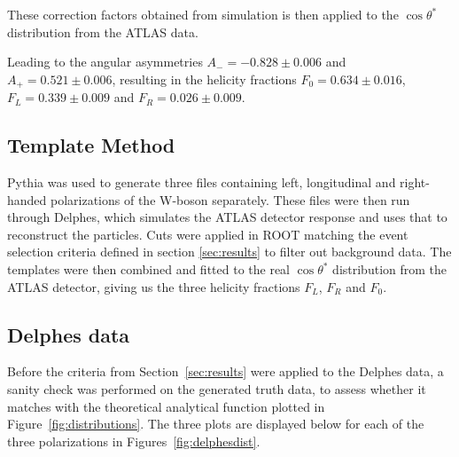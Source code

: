 \documentclass[12pt,a4paper]{article}
\numberwithin{equation}{section}
\begin{document}
These correction factors obtained from simulation is then applied to the
$\cos\theta^{*}$ distribution from the ATLAS data.

Leading to the angular asymmetries $A_- = -0.828 \pm 0.006$ and
$A_+ = 0.521 \pm 0.006$, resulting in the helicity fractions
$F_0=0.634 \pm 0.016$, $F_L=0.339 \pm 0.009$ and $F_R=0.026 \pm 0.009$.

\subsection{Template Method}
Pythia was used to generate three files containing left, longitudinal and
right-handed polarizations of the W-boson separately. These files were then run
through Delphes, which simulates the ATLAS detector response and uses that to
reconstruct the particles. Cuts were applied in ROOT matching the event
selection criteria defined in section \ref{sec:results} to filter out background
data. The templates were then combined and fitted to the real $\cos \theta^{*}$
distribution from the ATLAS detector, giving us the three helicity fractions
$F_L$, $F_R$ and $F_0$.


\subsection{Delphes data}
Before the criteria from Section~\ref{sec:results} were applied to the Delphes
data, a sanity check was performed on the generated truth data, to assess
whether it matches with the theoretical analytical function plotted in
Figure~\ref{fig:distributions}. The three plots are displayed below for each of
the three polarizations in Figures~\ref{fig:delphesdist}.\\
\end{document}
